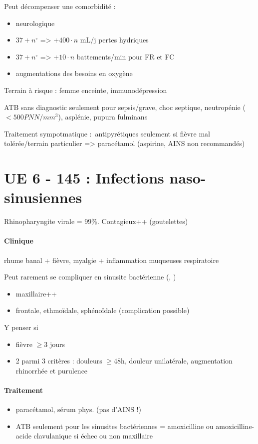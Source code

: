 \documentclass{article}
\providecommand{\tightlist}{%
  \setlength{\itemsep}{0pt}\setlength{\parskip}{0pt}}
\newcommand*{\TakeFourierOrnament}[1]{{%
\fontencoding{U}\fontfamily{futs}\selectfont\char#1}}
\newcommand*{\danger}{\TakeFourierOrnament{66}}
\begin{document}
Peut décompenser une comorbidité :

\begin{itemize}
\tightlist
\item
  neurologique
\item
  \(37 + n^\circ\) =\textgreater{} \(+400\cdot n\) mL/j pertes hydriques
\item
  \(37 + n^\circ\) =\textgreater{} \(+10 \cdot n\) battements/min pour
  FR et FC
\item
  augmentations des besoins en oxygène
\end{itemize}

Terrain à risque : femme enceinte, immunodépression

\danger ATB sans diagnostic seulement pour sepsis/grave, choc septique,
neutropénie (\(< 500 PNN/mm^3\)), asplénie, pupura fulminans

Traitement sympotmatique :~antipyrétiques seulement si fièvre mal
tolérée/terrain particulier =\textgreater{} paracétamol (aspirine, AINS
non recommandés)

\section{UE 6 - 145 : Infections naso-sinusiennes}%
\label{sec:item_145_infections_naso_sinusiennes}

Rhinopharyngite virale =  99\%. Contagieux++ (goutelettes)

\paragraph{Clinique} rhume banal + fièvre, myalgie + inflammation muqueuses respiratoire

Peut rarement se compliquer en sinusite bactérienne (,
)
\begin{itemize}
  \item maxillaire++
  \item frontale, ethmoïdale, sphénoïdale (complication possible)
\end{itemize}
Y penser si 
\begin{itemize}
  \item fièvre $\ge 3$ jours
    \item 2 parmi 3 critères : douleurs $\ge 48$h, douleur unilatérale,
      augmentation rhinorrhée et purulence
\end{itemize}

\paragraph{Traitement}%
\label{par:traitement}
\begin{itemize}
  \item paracétamol, sérum phys. (pas d'AINS !)
  \item ATB seulement pour les sinusites bactériennes = amoxicilline ou
    amoxicilline-acide clavulanique si échec ou non maxillaire
\end{itemize}
\end{document}
